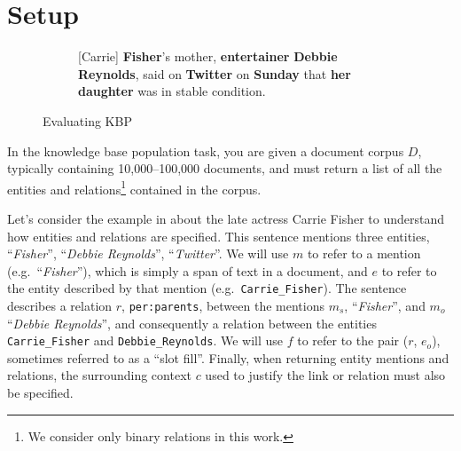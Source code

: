 \section{Setup}
\label{sec:setup}


\begin{figure*}[ht]
  \centering
  \begin{subfigure}{0.49\textwidth}
    [Carrie] \textbf{Fisher}’s mother, \textbf{entertainer} \textbf{Debbie Reynolds}, said on \textbf{Twitter} on \textbf{Sunday} that \textbf{her daughter} was in stable condition.
  \end{subfigure}
  \hfill
  \begin{subfigure}{0.49\textwidth}
  
  \end{subfigure}
  \caption{Evaluating KBP}
\end{figure*}

In the knowledge base population task, 
 you are given a document corpus $D$, typically containing 10,000--100,000 documents,
 and must return a list of all the entities and relations\footnote{
 We consider only binary relations in this work.
 } contained in the corpus.

Let's consider the example in  about the late actress Carrie Fisher to understand how entities and relations are specified. 
This sentence mentions three entities,
  ``\textit{Fisher}'',
  ``\textit{Debbie Reynolds}'',
  ``\textit{Twitter}''.
We will use $m$ to refer to a mention (e.g.\ ``\textit{Fisher}''), which is simply a span of text in a document, and $e$ to refer to the entity described by that mention (e.g.\ \texttt{Carrie\_Fisher}).
The sentence describes a relation $r$, \texttt{per:parents}, between the mentions $m_s$, ``\textit{Fisher}'', and $m_o$ ``\textit{Debbie Reynolds}'', and consequently a relation between the entities \texttt{Carrie\_Fisher} and \texttt{Debbie\_Reynolds}.
We will use $f$ to refer to the pair ($r$, $e_o$), sometimes referred to as a ``slot fill''.
Finally, when returning entity mentions and relations, the surrounding context $c$ used to justify the link or relation must also be specified.


